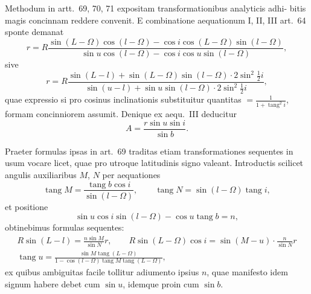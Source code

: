 \documentclass[12pt,a4paper]{article}
\newcommand{\tang}{\mathop{\mathrm{tang}}\nolimits}
\begin{document}
\section{}

Methodum in artt.~69, 70, 71 expositam transformationibus analyticis adhi-
bitis magis concinnam reddere convenit. E combinatione aequationum I, II, III
art.~64 sponte demanat
\[
r = R\frac{\sin(L - \Omega)\cos(l - \Omega) - \cos i\cos(L - \Omega)\sin(l - \Omega)}{\sin u\cos(l - \Omega) - \cos i\cos u\sin(l - \Omega)},
\]
sive
\begin{equation}
r = R\frac{\sin(L - l) + \sin(L - \Omega)\sin(l - \Omega)\cdot 2\sin^2\frac{1}{2}i}{\sin(u - l) + \sin u\sin(l - \Omega)\cdot 2\sin^2\frac{1}{2}i},
\end{equation}
quae expressio si pro cosinus inclinationis substituitur quantitas $= \frac{1}{1+\tang^2 i}$,
formam concinniorem assumit. Denique ex aequ.~III deducitur
\begin{equation}
A = \frac{r\sin u\sin i}{\sin b}.
\end{equation}

Praeter formulas ipsas in art.~69 traditas etiam transformationes sequentes
in usum vocare licet, quae pro utroque latitudinis signo valeant. Introductis
scilicet angulis auxiliaribus $M$, $N$ per aequationes
\[
\tang M = \frac{\tang b\cos i}{\sin(l - \Omega)}, \qquad \tang N = \sin(l - \Omega)\tang i,
\]
et positione
\[
\sin u\cos i\sin(l - \Omega) - \cos u\tang b = n,
\]
obtinebimus formulas sequentes:
\begin{gather*}
R\sin(L - l) = \frac{n\sin M}{\sin N}r, \qquad R\sin(L - \Omega)\cos i = \sin(M - u)\cdot\frac{n}{\sin N}r \\
\tang u = \frac{\sin M\tang(L - \Omega)}{1 - \cos(l - \Omega)\tang M\tang(L - \Omega)},
\end{gather*}
ex quibus ambiguitas facile tollitur adiumento ipsius $n$, quae manifesto idem
signum habere debet cum $\sin u$, idemque proin cum $\sin b$.
\end{document}
